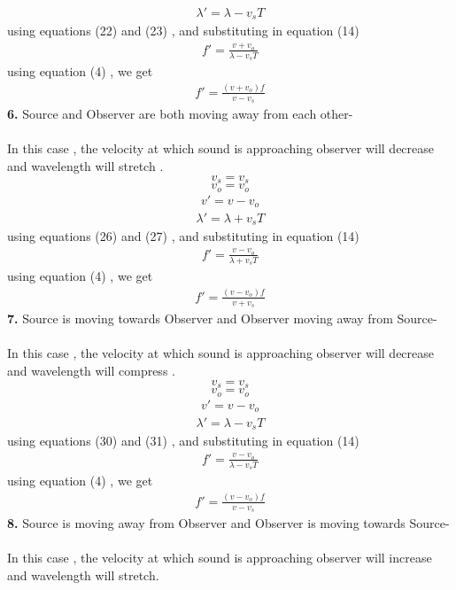 \documentclass[journal,12pt,twocolumn]{IEEEtran}
\theoremstyle{remark}
\begin{document}
\begin{align}\lambda' = \lambda - v_s T\end{align}
using equations (22) and (23) , and substituting in equation (14) 
\begin{align}f' = \frac{v+v_o}{\lambda-v_s T}\end{align}
using equation (4) , we get 
\begin{align}f' = \frac{(v+v_o) f}{v-v_s }\end{align}
\textbf{6.} Source and Observer are both moving away from each other-\\\\
In this case , the velocity at which sound is approaching observer will decrease and wavelength will stretch .
$$v_s = v_s$$
$$v_o = v_o$$
\begin{align}v'= v-v_o\end{align}
\begin{align}\lambda' = \lambda + v_s T\end{align}
using equations (26) and (27) , and substituting in equation (14) 
\begin{align}f' = \frac{v-v_o}{\lambda+v_s T}\end{align}
using equation (4) , we get 
\begin{align}f' = \frac{(v-v_o) f}{v +v_s}\end{align}
\textbf{7.} Source is moving towards Observer and Observer moving away from Source-\\\\
In this case , the velocity at which sound is approaching observer will decrease and wavelength will compress .
$$v_s = v_s$$
$$v_o = v_o$$
\begin{align}v'= v-v_o\end{align}
\begin{align}\lambda' = \lambda - v_s T\end{align}
using equations (30) and (31) , and substituting in equation (14) 
\begin{align}f' = \frac{v-v_o}{\lambda-v_s T}\end{align}
using equation (4) , we get 
\begin{align}f' = \frac{(v-v_o) f}{v -v_s}\end{align}
\textbf{8.} Source is moving away from Observer and Observer is moving towards Source-\\\\
In this case , the velocity at which sound is approaching observer will increase and wavelength will stretch.
\end{document}
